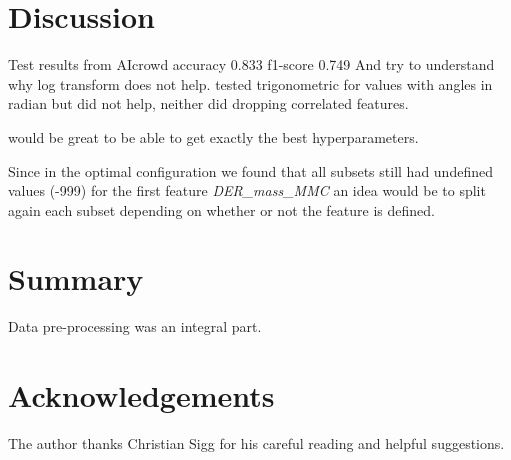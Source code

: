 \documentclass[10pt,conference,compsocconf]{IEEEtran}
\begin{document}
\section{Discussion}

Test results from AIcrowd accuracy 0.833 f1-score 0.749	
And try to understand why log transform does not help. tested trigonometric 
for values with angles in radian but did not help, neither did dropping correlated features.

would be great to be able to get exactly the best hyperparameters. 

Since in the optimal configuration we found that all subsets still had undefined values (-999) for the first feature \textit{DER\_mass\_MMC} an idea would be to split again each subset
depending on whether or not the feature is defined.

\section{Summary}

Data pre-processing was an integral part. 

\section*{Acknowledgements}
The author thanks Christian Sigg for his careful reading and helpful
suggestions.

\pagebreak
\end{document}
